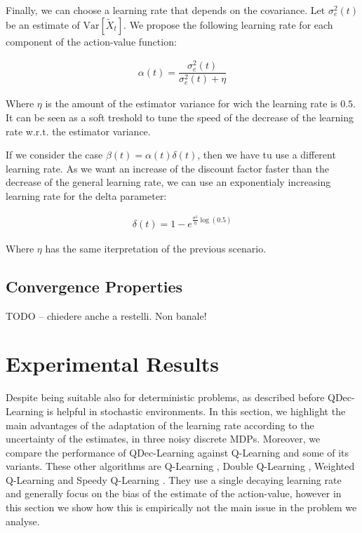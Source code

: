 \documentclass[conference]{IEEEtran}
\begin{document}
Finally, we can choose a learning rate that depends on the covariance. Let $\sigma_e^2(t)$ be an estimate of $\mathrm{Var}\left[\widetilde{X}_{t}\right]$. We propose the following learning rate for each component of the action-value function:

\begin{align}
 \alpha(t)=\dfrac{\sigma_e^2(t)}{\sigma_e^2(t)+\eta}
\end{align}

Where $\eta$ is the amount of the estimator variance for wich the learning rate is $0.5$. It can be seen as a soft treshold to tune the speed of the decrease of the learning rate w.r.t. the estimator variance.

If we consider the case $\beta(t)=\alpha(t)\delta(t)$, then we have tu use a different learning rate. As we want an increase of the discount factor faster than the decrease of the general learning rate, we can use an exponentialy increasing learning rate for the delta parameter:

\begin{align}\label{E:delta_eq}
 \delta(t) = 1- e^{\frac{\sigma^2}{\eta}\log(0.5)}
\end{align}

Where $\eta$ has the same iterpretation of the previous scenario.


\subsection{Convergence Properties}

TODO -- chiedere anche a restelli. Non banale!


\section{Experimental Results}
Despite being suitable also for deterministic problems, as described before QDec-Learning is helpful in stochastic environments. In this section, we highlight the main advantages of the adaptation of the learning rate according to the uncertainty of the estimates, in three noisy discrete MDPs. Moreover, we compare the performance of QDec-Learning against Q-Learning and some of its variants. These other algorithms are Q-Learning \cite{watkins1992q}, Double Q-Learning \cite{van2010double}, Weighted Q-Learning \cite{d2016estimating} and Speedy Q-Learning \cite{NIPS2011_4251}. They use a single decaying learning rate and generally focus on the bias of the estimate of the action-value, however in this section we show how this is empirically not the main issue in the problem we analyse.
\end{document}
